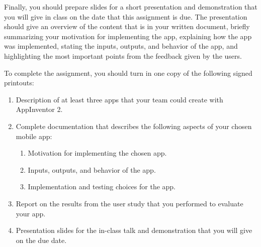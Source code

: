 Finally, you should prepare slides for a short presentation and demonstration that you will give in class on the date
that this assignment is due.  The presentation should give an overview of the content that is in your written document,
briefly summarizing your motivation for implementing the app, explaining how the app was implemented, stating the inputs,
outputs, and behavior of the app, and highlighting the most important points from the feedback given by the users.


\noindent
To complete the assignment, you should turn in one copy of the following signed printouts: 
\vspace*{-.1in}
\begin{enumerate}
  \itemsep0em

  \item Description of at least three apps that your team could create with AppInventor 2.

  \item Complete documentation that describes the following aspects of your chosen mobile app:

    \vspace*{-.05in}
    \begin{enumerate}
      \item Motivation for implementing the chosen app.
      \item Inputs, outputs, and behavior of the app.
      \item Implementation and testing choices for the app.
    \end{enumerate}
    \vspace*{-.05in}

  \item Report on the results from the user study that you performed to evaluate your app.

  \item Presentation slides for the in-class talk and demonstration that you will give on the due date.

\end{enumerate}


